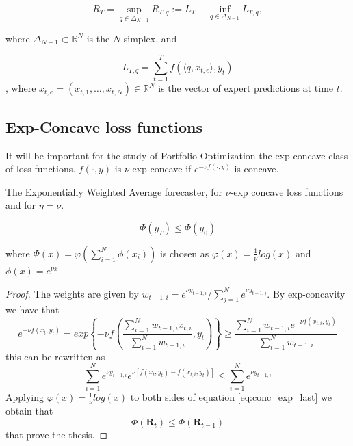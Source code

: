 \begin{equation}
    R_T = \sup\limits_{q\in\Delta_{N-1}}R_{T,q}:=L_T-\inf\limits_{q\in\Delta_{N-1}}L_{T,q},
\end{equation}



where $\Delta_{N-1}\subset \mathbb R^{N}$ is the $N$-simplex, and 

$$L_{T,q}=\sum\limits_{t=1}^T f(\langle q,x_{t,e}\rangle,y_t)$$,
where $x_{t,e}=(x_{t,1},\ldots,x_{t,N})\in\mathbb R^N$ is the vector of expert predictions at time $t$.
\subsection{Exp-Concave loss functions}
It will be important for the study of Portfolio Optimization the exp-concave class of loss functions.
$f(\cdot,y)$ is $\nu$-exp concave if $e^{-\nu f(\cdot,y)}$ is concave.

\begin{theorem}\label{th:General_Blk}
The Exponentially Weighted Average forecaster, for $\nu$-exp concave loss functions and for $\eta=\nu$.

$$\Phi(y_T)\le \Phi(y_0)$$

where $\Phi(x)=\varphi\left(\sum\limits_{i=1}^N\phi(x_i)\right)$ is chosen as $\varphi(x)=\frac{1}{\nu}log(x)$ and $\phi(x)=e^{\nu x}$

\end{theorem}

\begin{proof}
    The weights are given by $w_{t-1,i}=e^{\nu y_{t-1,i}}/\sum\limits_{j=1}^N e^{\nu y_{t-1,j}}$.
    By exp-concavity we have that
    \begin{equation}
        e^{-\nu f(x_t,y_t)}=exp\left\{-\nu f \left(\frac{\sum\limits_{i=1}^N w_{t-1,i}x_{t,i}}{\sum\limits_{i=1}^N w_{t-1,i}},y_t\right)\right\}\ge \frac{\sum\limits_{i=1}^N w_{t-1,i}e^{-\nu f(x_{t,i},y_t)}}{\sum\limits_{i=1}^N w_{t-1,i}}
    \end{equation}
    this can be rewritten as 
    \begin{equation}\label{eq:conc_exp_last}
        \sum\limits_{i=1}^N e^{\nu y_{t-1,i}}e^{\nu [f(x_t,y_t)-f(x_{t,i},y_t)]}\le \sum\limits_{i=1}^N e^{\nu y_{t-1,i}}
    \end{equation}
    Applying $\varphi(x)=\frac{1}{\nu}log(x)$ to both sides of equation \eqref{eq:conc_exp_last} we obtain that $$\Phi(\mathbf R_{t})\le \Phi(\mathbf R_{t-1})$$ that prove the thesis.
\end{proof}

